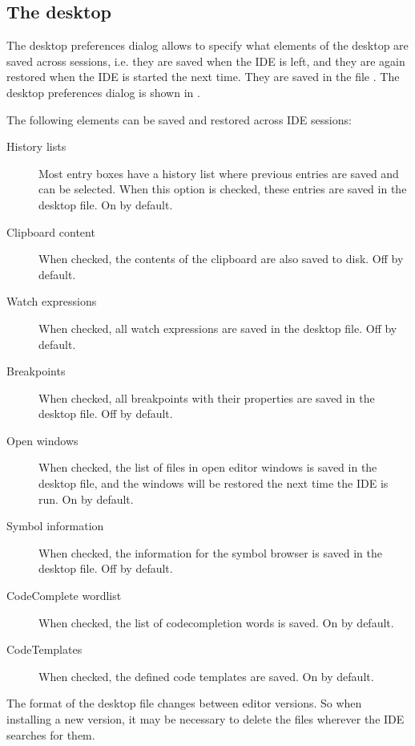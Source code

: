 \subsection{The desktop}
\label{se:prefdesktop}
The desktop preferences dialog allows to specify what elements of the
desktop are saved across sessions, i.e. they are saved when the IDE is left,
and they are again restored when the IDE is started the next time.
They are saved in the file .
The desktop preferences dialog is shown in .


The following elements can be saved and restored across IDE sessions:
\begin{description}
\item[History lists] Most entry boxes have a history list where previous
entries are saved and can be selected. When this option is checked, these
entries are saved in the desktop file. On by default.
\item[Clipboard content]
When checked, the contents of the clipboard are also saved to disk. Off by
default.
\item[Watch expressions]
When checked, all watch expressions are saved in the desktop file. Off by
default.
\item[Breakpoints]
When checked, all breakpoints with their properties are saved in the
desktop file. Off by default.
\item[Open windows]
When checked, the list of files in open editor windows is saved in the
desktop file, and the windows will be restored the next time the IDE
is run. On by default.
\item[Symbol information]
When checked, the information for the symbol browser is saved in the desktop
file. Off by default.
\item[CodeComplete wordlist]
When checked, the list of codecompletion words is saved. On by default.
\item[CodeTemplates]
When checked, the defined code templates are saved. On by default.
\end{description}

\begin{remark}
The format of the desktop file changes between editor versions. So
when installing a new version, it may be necessary to delete the
 files wherever the IDE searches for them.
\end{remark}

%
%
